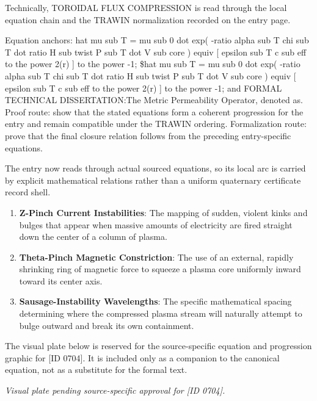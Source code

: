 Technically, TOROIDAL FLUX COMPRESSION is read through the local equation chain and the TRAWIN normalization recorded on the entry page.

Equation anchors: hat mu sub T = mu sub 0 dot exp( -ratio alpha sub T chi sub T dot ratio H sub twist P sub T dot V sub core ) equiv [ epsilon sub T c sub eff to the power 2(r) ] to the power -1; \$hat mu sub T = mu sub 0 dot exp( -ratio alpha sub T chi sub T dot ratio H sub twist P sub T dot V sub core ) equiv [ epsilon sub T c sub eff to the power 2(r) ] to the power -1; and FORMAL TECHNICAL DISSERTATION:The Metric Permeability Operator, denoted as. Proof route: show that the stated equations form a coherent progression for the entry and remain compatible under the TRAWIN ordering. Formalization route: prove that the final closure relation follows from the preceding entry-specific equations.

The entry now reads through actual sourced equations, so its local arc is carried by explicit mathematical relations rather than a uniform quaternary certificate record shell.
\endgroup

\begin{enumerate}[leftmargin=1.6em,itemsep=6pt,topsep=4pt]
\item \textbf{Z-Pinch Current Instabilities}: The mapping of sudden, violent kinks and bulges that appear when massive amounts of electricity are fired straight down the center of a column of plasma.
\item \textbf{Theta-Pinch Magnetic Constriction}: The use of an external, rapidly shrinking ring of magnetic force to squeeze a plasma core uniformly inward toward its center axis.
\item \textbf{Sausage-Instability Wavelengths}: The specific mathematical spacing determining where the compressed plasma stream will naturally attempt to bulge outward and break its own containment.
\end{enumerate}

\begingroup\footnotesize\sloppy
The visual plate below is reserved for the source-specific equation and progression graphic for [ID 0704]. It is included only as a companion to the canonical equation, not as a substitute for the formal text.
\par\endgroup
\begingroup\footnotesize\itshape
Visual plate pending source-specific approval for [ID 0704].
\par\endgroup

